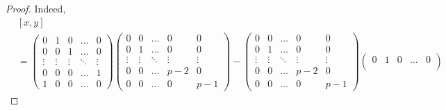 \documentclass[12pt]{article}
\theoremstyle{definition}
\begin{document}
\begin{proof}
	Indeed, \begin{align*}        & [x, y]                                                                                  \\
                      & = \begin{pmatrix}
		                          0      & 1      & 0      & \dots  & 0      \\
		                          0      & 0      & 1      & \dots  & 0      \\
		                          \vdots & \vdots & \vdots & \ddots & \vdots \\
		                          0      & 0      & 0      & \dots  & 1      \\
		                          1      & 0      & 0      & \dots  & 0
	                          \end{pmatrix} \begin{pmatrix}
		                                        0      & 0      & \dots  & 0      & 0      \\
		                                        0      & 1      & \dots  & 0      & 0      \\
		                                        \vdots & \vdots & \ddots & \vdots & \vdots \\
		                                        0      & 0      & \dots  & p-2    & 0      \\
		                                        0      & 0      & \dots  & 0      & p-1
	                                        \end{pmatrix} - \begin{pmatrix}
		                                                        0      & 0      & \dots  & 0      & 0      \\
		                                                        0      & 1      & \dots  & 0      & 0      \\
		                                                        \vdots & \vdots & \ddots & \vdots & \vdots \\
		                                                        0      & 0      & \dots  & p-2    & 0      \\
		                                                        0      & 0      & \dots  & 0      & p-1
	                                                        \end{pmatrix}\begin{pmatrix}
		                                                                     0      & 1      & 0      & \dots  & 0      \\

\end{pmatrix}
\end{align*}
\end{proof}
\end{document}
